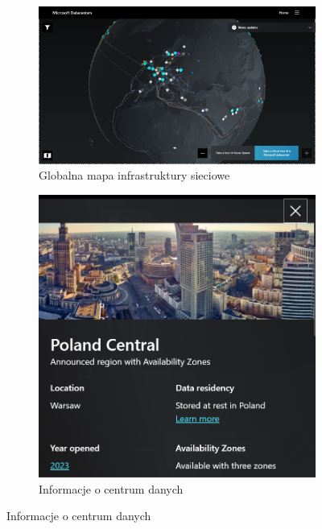 \begin{figure}[H]
    \begin{subfigure}[m]{0.7\textwidth}
    \includegraphics[width=\textwidth]{images/azure-ic}
    \caption{Globalna mapa infrastruktury sieciowe}
    \end{subfigure}
    \hfill
    \begin{subfigure}[m]{0.25\textwidth}
        \includegraphics[width=\textwidth]{images/azure-pl}
        \caption{Informacje o centrum danych}
    \end{subfigure}
    \label{fig:azure-ic}
\end{figure}

